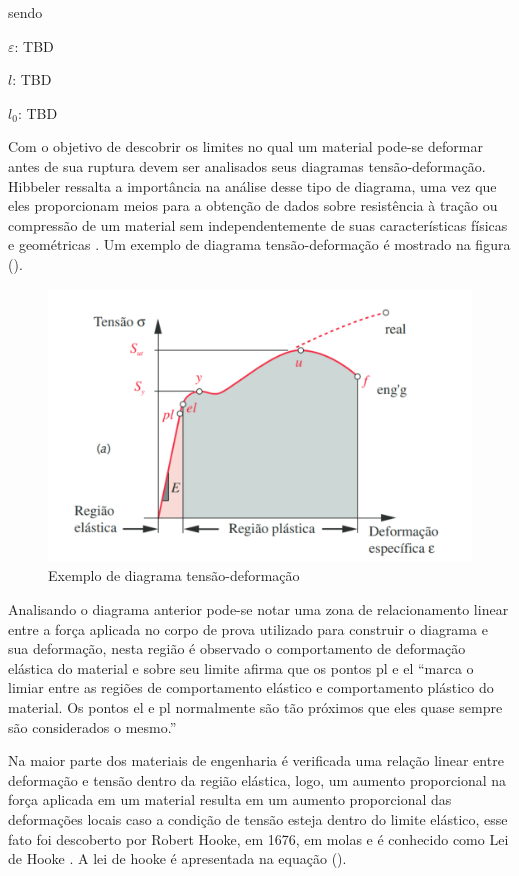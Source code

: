 sendo

$\varepsilon$: TBD

$l$: TBD

$l_0$: TBD

\hfill

Com o objetivo de descobrir os limites no qual um material pode-se deformar antes de sua ruptura devem ser analisados seus diagramas tensão-deformação. Hibbeler ressalta a importância na análise desse tipo de diagrama, uma vez que eles proporcionam meios para a obtenção de dados sobre resistência à tração ou compressão de um material sem independentemente de suas características físicas e geométricas \autocite{Hibbeler2010}. Um exemplo de diagrama tensão-deformação é mostrado na figura ().

\begin{figure}[htb]
	\caption{\label{fig:1020} Exemplo de diagrama tensão-deformação}
	\begin{center}
		\includegraphics[width=\textwidth]{pictures/1020.png}
	\end{center}
\end{figure}

Analisando o diagrama anterior pode-se notar uma zona de relacionamento linear entre a força aplicada no corpo de prova utilizado para construir o diagrama e sua deformação, nesta região é observado o comportamento de deformação elástica do material e sobre seu limite \autocite{Norton2011} afirma que os pontos pl e el “marca o limiar entre as regiões de comportamento elástico e comportamento plástico do material. Os pontos el e pl normalmente são tão próximos que eles quase sempre são considerados o mesmo.”

Na maior parte dos materiais de engenharia é verificada uma relação linear entre deformação e tensão dentro da região elástica, logo, um aumento proporcional na força aplicada em um material resulta em um aumento proporcional das deformações locais caso a condição de tensão esteja dentro do limite elástico, esse fato foi descoberto por Robert Hooke, em 1676, em molas e é conhecido como Lei de Hooke \autocite{Hibbeler2010}. A lei de hooke é apresentada na equação ().

